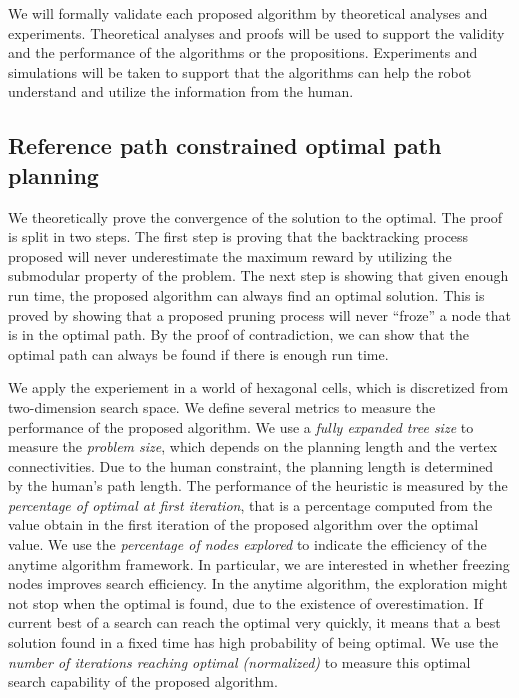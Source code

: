 \documentclass[phd]{byuprop}
\begin{document}
We will formally validate each proposed algorithm by theoretical analyses and experiments.
Theoretical analyses and proofs will be used to support the validity and the performance of the algorithms or the propositions.
Experiments and simulations will be taken to support that the algorithms can help the robot understand and utilize the information from the human.

\subsection{Reference path constrained optimal path planning}

We theoretically prove the convergence of the solution to the optimal.
The proof is split in two steps.
The first step is proving that the backtracking process proposed will never underestimate the maximum reward by utilizing the submodular property of the problem.
The next step is showing that given enough run time, the proposed algorithm can always find an optimal solution.
This is proved by showing that a proposed pruning process will never ``froze'' a node that is in the optimal path.
By the proof of contradiction, we can show that the optimal path can always be found if there is enough run time.

We apply the experiement in a world of hexagonal cells, which is discretized from two-dimension search space.
We define several metrics to measure the performance of the proposed algorithm.
We use a \emph{fully expanded tree size} to measure the \emph{problem size}, which depends on the planning length and the vertex connectivities.
Due to the human constraint, the planning length is determined by the human's path length.
The performance of the heuristic is measured by the \emph{percentage of optimal at first iteration}, that is a percentage computed from the value obtain in the first iteration of the proposed algorithm over the optimal value.
We use the \emph{percentage of nodes explored} to indicate the efficiency of the anytime algorithm framework.
In particular, we are interested in whether freezing nodes improves search efficiency.
In the anytime algorithm, the exploration might not stop when the optimal is found, due to the existence of overestimation.
If current best of a search can reach the optimal very quickly, it means that a best solution found in a fixed time has high probability of being optimal.
We use the \emph{number of iterations reaching optimal (normalized)} to measure this optimal search capability of the proposed algorithm.
\end{document}
